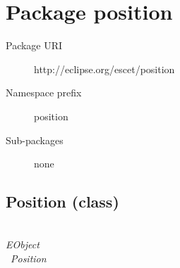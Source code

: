 

\section{Package position}\label{positionpkg:position}
\pkgdocuposition

\begin{description}
\item[Package URI] http://eclipse.org/escet/position
\item[Namespace prefix] position
\item[Sub-packages] none
\end{description}

\subsection{Position (class)}\label{positionclass:Position}
\clsdocuPosition

~\\ \noindent \emph{EObject} \\
\hook~\emph{Position}

